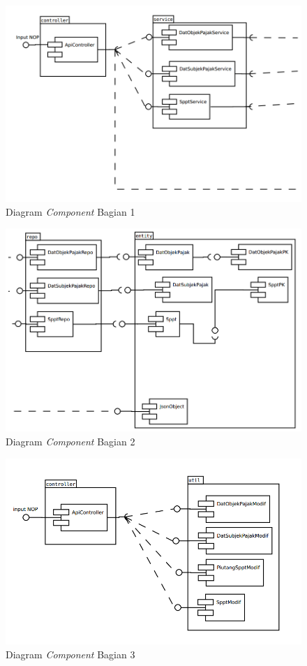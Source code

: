 \documentclass[pdftex,12pt, oneside]{article}
\begin{document}
\begin{figure}[H]
	\centering
	\includegraphics[width=1\textwidth]{./resources/comp-dia-backend-1}
	\caption{Diagram \textit{Component} Bagian 1}
	\label{fig:comp-dia-1}
\end{figure}

\begin{figure}[H]
	\centering
	\includegraphics[width=1\textwidth]{./resources/comp-dia-backend-2}
	\caption{Diagram \textit{Component} Bagian 2}
	\label{fig:comp-dia-2}
\end{figure}

\begin{figure}[H]
	\centering
	\includegraphics[width=1\textwidth]{./resources/comp-dia-backend-3}
	\caption{Diagram \textit{Component} Bagian 3}
	\label{fig:comp-dia-3}
\end{figure}
\end{document}
